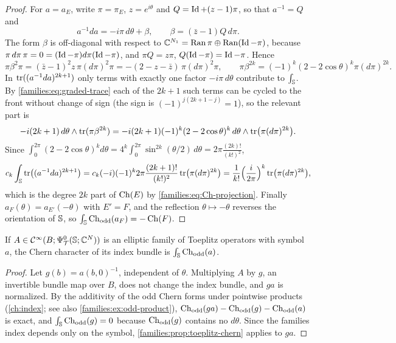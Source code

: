 \begin{proof}
  For $a=a_E$, write $\pi=\pi_E$, $z=e^{i\theta}$ and $Q=\operatorname{Id}+(z-1)\pi$, so that
  $a^{-1}=Q$ and
  \begin{equation*}
    a^{-1}da=-i\pi\,d\theta+\beta,\qquad\beta=(\bar z-1)Q\,d\pi.
  \end{equation*}
  The form $\beta$ is off-diagonal with respect to $\mathbb{C}^{N_1}=\operatorname{Ran}\pi\oplus
  \operatorname{Ran}(\operatorname{Id}-\pi)$, because $\pi\,d\pi\,\pi=0=(\operatorname{Id}-\pi)d\pi(\operatorname{Id}-\pi)$, and
  $\pi Q=z\pi$, $Q(\operatorname{Id}-\pi)=\operatorname{Id}-\pi$. Hence
  \begin{equation*}
    \pi\beta^2\pi=(\bar z-1)^2z\,\pi(d\pi)^2\pi=-(2-z-\bar z)\,\pi(d\pi)^2\pi,
    \qquad\pi\beta^{2k}=(-1)^k(2-2\cos\theta)^k\pi(d\pi)^{2k}.
  \end{equation*}
  In $\operatorname{tr}((a^{-1}da)^{2k+1})$ only terms with exactly one factor $-i\pi\,
  d\theta$ contribute to $\int_{\mathbb{S}}$. By \eqref{families:eq:graded-trace} each
  of the $2k+1$ such terms can be cycled to the front without change of sign
  (the sign is $(-1)^{j(2k+1-j)}=1$), so the relevant part is
  \begin{equation*}
    -i(2k+1)\,d\theta\wedge\operatorname{tr}(\pi\beta^{2k})=-i(2k+1)(-1)^k(2-2\cos\theta)^k
    \,d\theta\wedge\operatorname{tr}\bigl(\pi(d\pi)^{2k}\bigr).
  \end{equation*}
  Since $\int_0^{2\pi}(2-2\cos\theta)^kd\theta=4^k\int_0^{2\pi}\sin^{2k}(\theta/2)
  \,d\theta=2\pi\frac{(2k)!}{(k!)^2}$,
  \begin{equation*}
    c_k\int_{\mathbb{S}}\operatorname{tr}\bigl((a^{-1}da)^{2k+1}\bigr)=c_k(-i)(-1)^k2\pi
    \frac{(2k+1)!}{(k!)^2}\operatorname{tr}\bigl(\pi(d\pi)^{2k}\bigr)=\frac{1}{k!}\Bigl(
    \frac{i}{2\pi}\Bigr)^k\operatorname{tr}\bigl(\pi(d\pi)^{2k}\bigr),
  \end{equation*}
  which is the degree $2k$ part of $\operatorname{Ch}(E)$ by
  \eqref{families:eq:Ch-projection}. Finally $a_F(\theta)=a_{E'}(-\theta)$ with
  $E'=F$, and the reflection $\theta\mapsto-\theta$ reverses the orientation of
  $\mathbb{S}$, so $\int_{\mathbb{S}}\operatorname{Ch}_{\mathrm{odd}}(a_F)=-\operatorname{Ch}(F)$.
\end{proof}

\begin{corollary}\label{families:cor:toeplitz-chern}
  If $A\in\mathcal{C}^\infty(B;\Psi^0_{\mathcal T}(\mathbb{S};\mathbb{C}^N))$ is an elliptic family of
  Toeplitz operators with symbol $a$, the Chern character of its index bundle
  is $\int_{\mathbb{S}}\operatorname{Ch}_{\mathrm{odd}}(a)$.
\end{corollary}
\begin{proof}
  Let $g(b)=a(b,0)^{-1}$, independent of $\theta$. Multiplying $A$ by $g$, an
  invertible bundle map over $B$, does not change the index bundle, and $ga$
  is normalized. By the additivity of the odd Chern forms under pointwise
  products (\cref{ch:index}; see also \cref{families:ex:odd-product}),
  $\operatorname{Ch}_{\mathrm{odd}}(ga)-\operatorname{Ch}_{\mathrm{odd}}(g)-\operatorname{Ch}_{\mathrm{odd}}(a)$ is exact, and $\int_{\mathbb{S}}\operatorname{Ch}_{\mathrm{odd}}(g)=0$
  because $\operatorname{Ch}_{\mathrm{odd}}(g)$ contains no $d\theta$. Since the families index depends
  only on the symbol, \cref{families:prop:toeplitz-chern} applies to $ga$.
\end{proof}

